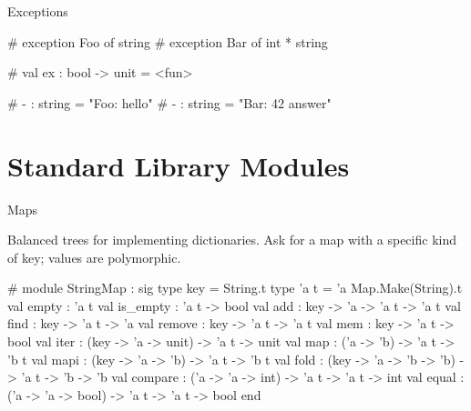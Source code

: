 \documentclass{plt}
\begin{document}
\begin{frame}[fragile]{Exceptions}

\begin{interactive}
# 
exception Foo of string
# 
exception Bar of int * string

# 
val ex : bool -> unit = <fun>

# 
- : string = "Foo: hello"
# 
- : string = "Bar: 42 answer"
\end{interactive}

\end{frame}

\part{Standard Library Modules}

\begin{frame}[fragile]{Maps}

\begin{scriptsize}
Balanced trees for implementing dictionaries.  Ask for a map with a
specific kind of key; values are polymorphic.

\begin{interactive}
# 
module StringMap :
  sig
    type key = String.t
    type 'a t = 'a Map.Make(String).t
    val empty : 'a t
    val is_empty : 'a t -> bool
    val add : key -> 'a -> 'a t -> 'a t
    val find : key -> 'a t -> 'a
    val remove : key -> 'a t -> 'a t
    val mem : key -> 'a t -> bool
    val iter : (key -> 'a -> unit) -> 'a t -> unit
    val map : ('a -> 'b) -> 'a t -> 'b t
    val mapi : (key -> 'a -> 'b) -> 'a t -> 'b t
    val fold : (key -> 'a -> 'b -> 'b) -> 'a t -> 'b -> 'b
    val compare : ('a -> 'a -> int) -> 'a t -> 'a t -> int
    val equal : ('a -> 'a -> bool) -> 'a t -> 'a t -> bool
  end
\end{interactive}
\end{scriptsize}

\end{frame}
\end{document}
